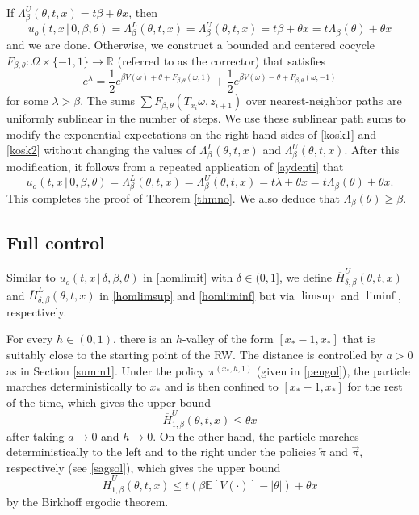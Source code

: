 \documentclass[a4paper]{amsart}
\numberwithin{equation}{section}
\theoremstyle{plain}
\theoremstyle{remark}
\begin{document}
If $\Lambda_\beta^U(\theta,t,x) = t\beta + \theta x$, then
$$u_o(t,x\,|\,0,\beta,\theta) = \Lambda_\beta^L(\theta,t,x) = \Lambda_\beta^U(\theta,t,x) = t\beta + \theta x = t\Lambda_\beta(\theta) + \theta x$$
and we are done. Otherwise, we construct a bounded and centered cocycle $F_{\beta,\theta}:\Omega\times\{-1,1\}\to\mathbb{R}$ (referred to as the corrector) that satisfies
\begin{equation}\label{aydenti}
e^\lambda = \frac1{2}e^{\beta V(\omega) + \theta + F_{\beta,\theta}(\omega,1)} + \frac1{2}e^{\beta V(\omega) - \theta + F_{\beta,\theta}(\omega,-1)}
\end{equation}
for some $\lambda>\beta$. The sums $\sum F_{\beta,\theta}(T_{x_i}\omega,z_{i+1})$ over nearest-neighbor paths are uniformly sublinear in the number of steps. We use these sublinear path sums to modify the exponential expectations on the right-hand sides of \eqref{kosk1} and \eqref{kosk2} without changing the values of $\Lambda_\beta^L(\theta,t,x)$ and $\Lambda_\beta^U(\theta,t,x)$. After this modification, it follows from  a repeated application of \eqref{aydenti} that
$$u_o(t,x\,|\,0,\beta,\theta) = \Lambda_\beta^L(\theta,t,x) = \Lambda_\beta^U(\theta,t,x) = t\lambda + \theta x = t\Lambda_\beta(\theta) + \theta x.$$
This completes the proof of Theorem \ref{thmno}. We also deduce that $\Lambda_\beta(\theta)\ge\beta$.

\subsection{Full control}\label{summ2}

Similar to $u_o(t,x\,|\,\delta,\beta,\theta)$ in \eqref{homlimit} with $\delta\in(0,1]$, we define $\overline H_{\delta,\beta}^U(\theta,t,x)$ and $\overline H_{\delta,\beta}^L(\theta,t,x)$ in \eqref{homlimsup} and \eqref{homliminf} but via $\limsup$ and $\liminf$, respectively.

For every $h\in(0,1)$, there is an $h$-valley of the form $[x_*-1,x_*]$ that is suitably close to the starting point of the RW. The distance is controlled by $a>0$ as in Section \ref{summ1}. Under the policy ${\pi^{(x_*,h,1)}}$ (given in \eqref{pengol}), the particle marches deterministically to $x_*$ and is then confined to $[x_*-1,x_*]$ for the rest of the time, which gives the upper bound
\begin{equation}\label{masog1}
\overline H_{1,\beta}^U(\theta,t,x) \le \theta x
\end{equation}
after taking $a\to0$ and $h\to0$. On the other hand, the particle marches deterministically to the left and to the right under the policies ${\overleftarrow\pi}$ and ${\overrightarrow\pi}$, respectively (see \eqref{sagsol}), which gives the upper bound
\begin{equation}\label{masog2}
\overline H_{1,\beta}^U(\theta,t,x) \le t(\beta\mathbb{E}[V(\cdot)] - |\theta|) + \theta x
\end{equation}
by the Birkhoff ergodic theorem.
\end{document}
